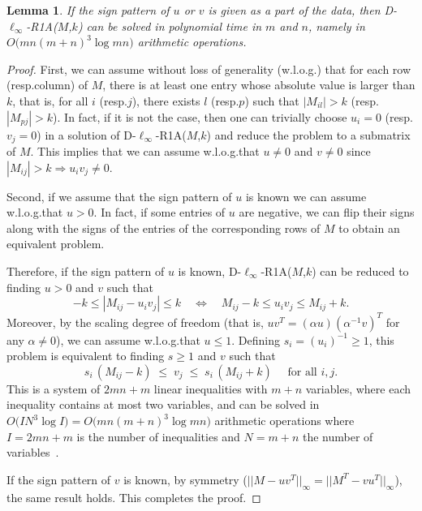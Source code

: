 \documentclass[a4paper,11pt]{article}
\newtheorem{lemma}{Lemma}
\numberwithin{equation}{section}
\begin{document}
\begin{lemma} \label{lemsignpat}  
If the sign pattern of $u$ or $v$ is given as a part of the data, 
then D-$\ell_\infty$-R1A($M$,$k$) can be solved in polynomial time in $m$ and $n$, 
namely in $O\big( mn (m+n)^3 \log mn \big)$ arithmetic operations.  
\end{lemma}
\begin{proof}
First, we can assume without loss of generality (w.l.o.g.) that for each row (resp.\@ column) of $M$, there is at least one entry whose absolute value is larger than $k$, that is, for all $i$ (resp.\@ $j$), there exists $l$ (resp.\@ $p$) such that $|M_{il}| > k$ (resp.\@ $|M_{pj}| > k$). 
In fact, if it is not the case, then one can trivially choose $u_i = 0$ (resp.\@ $v_j = 0$) in a solution of D-$\ell_\infty$-R1A($M$,$k$) and reduce the problem to a submatrix of $M$. 
This implies that we can assume w.l.o.g.\@ that $u \neq 0$ and $v \neq 0$ since $|M_{ij}| > k \Rightarrow u_i v_j \neq 0$. 

Second, if we assume that the sign pattern of $u$ is known we can assume w.l.o.g.\@ that $u > 0$. 
In fact, if some entries of $u$ are negative, we can flip their signs along with the signs of the entries of the corresponding rows of $M$ to obtain an equivalent problem. 

Therefore, if the sign pattern of $u$ is known, D-$\ell_\infty$-R1A($M$,$k$) can be reduced to finding $u > 0$ and $v$ such that 
\[
-k \leq |M_{ij} - u_i v_j| \leq k 
\quad \iff \quad 
M_{ij}-k \leq u_i v_j \leq M_{ij}+k. 
\]
Moreover, by the scaling degree of freedom (that is, $uv^T = (\alpha u)(\alpha^{-1} v)^T$ for any $\alpha \neq 0$), we can assume w.l.o.g.\@ that $u \leq 1$. 
Defining $s_i = (u_i)^{-1} \geq 1$, %
this problem is equivalent to finding $s \geq 1$ and $v$ such that 
\[
s_i \, (M_{ij}-k) 
\; \leq \; 
 v_j \; \leq \; 
s_i \, (M_{ij}+k) \quad \text{ for all } i,j. 
\] 
This is a system of $2mn+m$ linear inequalities with $m+n$ variables, 
where each inequality contains at most two variables, 
and can be solved in $O\big( I N^3 \log I \big) = O\big( mn (m+n)^3 \log mn \big)$ arithmetic operations where $I=2mn+m$ is the number of inequalities and $N=m+n$ the number of variables~\cite{megiddo1983towards}. 

If the sign pattern of $v$ is known, by symmetry ($||M-uv^T||_{\infty} = ||M^T - v u^T||_{\infty}$), the same result holds.  This completes the proof. 
\end{proof}
\end{document}
